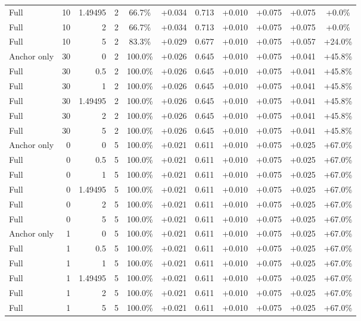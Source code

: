 \begin{table}[htbp]
\begin{tabular}{lrrrccccccc}
Full & 10 & 1.49495 & 2 & 66.7\% & +0.034 & 0.713 & +0.010 & +0.075 & +0.075 & +0.0\% \\
Full & 10 & 2 & 2 & 66.7\% & +0.034 & 0.713 & +0.010 & +0.075 & +0.075 & +0.0\% \\
Full & 10 & 5 & 2 & 83.3\% & +0.029 & 0.677 & +0.010 & +0.075 & +0.057 & +24.0\% \\
Anchor only & 30 & 0 & 2 & 100.0\% & +0.026 & 0.645 & +0.010 & +0.075 & +0.041 & +45.8\% \\
Full & 30 & 0.5 & 2 & 100.0\% & +0.026 & 0.645 & +0.010 & +0.075 & +0.041 & +45.8\% \\
Full & 30 & 1 & 2 & 100.0\% & +0.026 & 0.645 & +0.010 & +0.075 & +0.041 & +45.8\% \\
Full & 30 & 1.49495 & 2 & 100.0\% & +0.026 & 0.645 & +0.010 & +0.075 & +0.041 & +45.8\% \\
Full & 30 & 2 & 2 & 100.0\% & +0.026 & 0.645 & +0.010 & +0.075 & +0.041 & +45.8\% \\
Full & 30 & 5 & 2 & 100.0\% & +0.026 & 0.645 & +0.010 & +0.075 & +0.041 & +45.8\% \\
Anchor only & 0 & 0 & 5 & 100.0\% & +0.021 & 0.611 & +0.010 & +0.075 & +0.025 & +67.0\% \\
Full & 0 & 0.5 & 5 & 100.0\% & +0.021 & 0.611 & +0.010 & +0.075 & +0.025 & +67.0\% \\
Full & 0 & 1 & 5 & 100.0\% & +0.021 & 0.611 & +0.010 & +0.075 & +0.025 & +67.0\% \\
Full & 0 & 1.49495 & 5 & 100.0\% & +0.021 & 0.611 & +0.010 & +0.075 & +0.025 & +67.0\% \\
Full & 0 & 2 & 5 & 100.0\% & +0.021 & 0.611 & +0.010 & +0.075 & +0.025 & +67.0\% \\
Full & 0 & 5 & 5 & 100.0\% & +0.021 & 0.611 & +0.010 & +0.075 & +0.025 & +67.0\% \\
Anchor only & 1 & 0 & 5 & 100.0\% & +0.021 & 0.611 & +0.010 & +0.075 & +0.025 & +67.0\% \\
Full & 1 & 0.5 & 5 & 100.0\% & +0.021 & 0.611 & +0.010 & +0.075 & +0.025 & +67.0\% \\
Full & 1 & 1 & 5 & 100.0\% & +0.021 & 0.611 & +0.010 & +0.075 & +0.025 & +67.0\% \\
Full & 1 & 1.49495 & 5 & 100.0\% & +0.021 & 0.611 & +0.010 & +0.075 & +0.025 & +67.0\% \\
Full & 1 & 2 & 5 & 100.0\% & +0.021 & 0.611 & +0.010 & +0.075 & +0.025 & +67.0\% \\
Full & 1 & 5 & 5 & 100.0\% & +0.021 & 0.611 & +0.010 & +0.075 & +0.025 & +67.0\% \\

\end{tabular}
\end{table}
